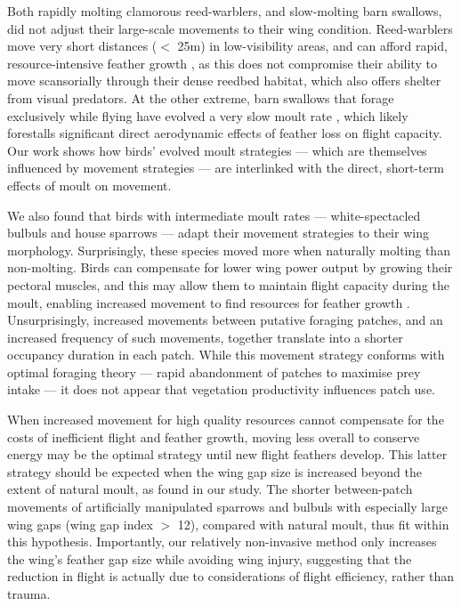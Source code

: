 Both rapidly molting clamorous reed-warblers, and slow-molting barn swallows, did not adjust their large-scale movements to their wing condition.
Reed-warblers move very short distances ($<$ 25m) in low-visibility areas, and can afford rapid, resource-intensive feather growth \citep{lindstrom1993,newton2009,kiat2017}, as this does not compromise their ability to move scansorially through their dense reedbed habitat, which also offers shelter from visual predators.
At the other extreme, barn swallows that forage exclusively while flying have evolved a very slow moult rate \cite{kiat2016}, which likely forestalls significant direct aerodynamic effects of feather loss on flight capacity.
Our work shows how birds' evolved moult strategies --- which are themselves influenced by movement strategies \cite{kiat2016} --- are interlinked with the direct, short-term effects of moult on movement.

We also found that birds with intermediate moult rates --- white-spectacled bulbuls and house sparrows --- adapt their movement strategies to their wing morphology.
Surprisingly, these species moved more when naturally molting than non-molting.
Birds can compensate for lower wing power output by growing their pectoral muscles, and this may allow them to maintain flight capacity during the moult, enabling increased movement to find resources for feather growth \cite{chai1997,swaddle1997}.
Unsurprisingly, increased movements between putative foraging patches, and an increased frequency of such movements, together translate into a shorter occupancy duration in each patch.
While this movement strategy conforms with optimal foraging theory --- rapid abandonment of patches to maximise prey intake \cite{charnov1976} --- it does not appear that vegetation productivity influences patch use.

When increased movement for high quality resources \cite{charnov1976} cannot compensate for the costs of inefficient flight and feather growth, moving less overall to conserve energy may be the optimal strategy until new flight feathers develop.
This latter strategy should be expected when the wing gap size is increased beyond the extent of natural moult, as found in our study.
The shorter between-patch movements of artificially manipulated sparrows and bulbuls with especially large wing gaps (wing gap index $>$ 12), compared with natural moult, thus fit within this hypothesis.
Importantly, our relatively non-invasive method only increases the wing's feather gap size while avoiding wing injury, suggesting that the reduction in flight is actually due to considerations of flight efficiency, rather than trauma.

